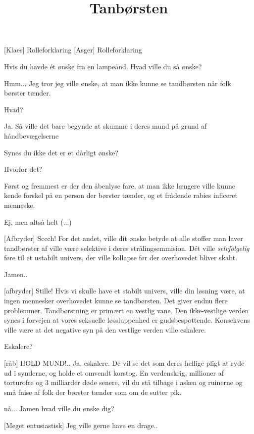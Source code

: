 \documentclass[a4paper,11pt]{article}
\title{Tanbørsten}
\begin{document}
\maketitle

\begin{roles}
    [Klaes] Rolleforklaring
    [Asger] Rolleforklaring
\end{roles}

\begin{sketch}


 Hvis du havde ét ønske fra en lampeånd. Hvad ville du så ønske?

 Hmm...  Jeg tror jeg ville ønske, at man ikke kunne se tandbørsten når folk børster tænder.

 Hvad?

 Ja. Så ville det bare begynde at skumme i deres mund på grund af håndbevægelserne 

 Synes du ikke det er et dårligt ønske?

 Hvorfor det?

 Først og fremmest er der den åbenlyse fare, at man ikke længere ville kunne kende forskel på en person der børster tænder, og et frådende rabies inficeret menneske.

 Ej, men altså helt (...)

[Afbryder] Sccch! For det andet, ville dit ønske betyde at alle stoffer man laver tandbørster af ville være selektive i deres strålingsemmision. Dét ville \emph{selvfølgelig} føre til et ustabilt univers, der ville kollapse før der overhovedet bliver skabt. 

 Jamen..

[afbryder] Stille! Hvis vi skulle have et stabilt univers, ville din løsning være, at ingen mennesker overhovedet kunne se tandbørsten. Det giver endnu flere problemmer. Tandbørstning er primært en vestlig vane. Den ikke-vestlige verden synes i forvejen at vores seksuelle løssluppenhed er gudsbespottende. Konsekvens ville være at det negative syn på den vestlige verden ville eskalere.

 Eskalere?

[råb] HOLD MUND!.. Ja, eskalere. De vil se det som deres hellige pligt at ryde ud i synderne, og  holde et omvendt korstog. En verdenskrig, millioner af torturofre og 3 milliarder døde senere, vil du stå tilbage i asken og ruinerne og små fnise af folk der børster tænder som om de sutter pik.

  nå... Jamen hvad ville du ønske dig?

 [Meget entusiastisk] Jeg ville gerne have en drage..


\end{sketch}
\end{document}
